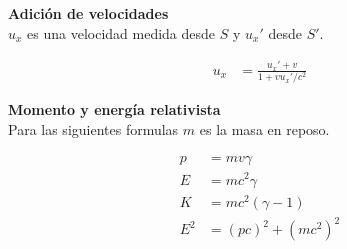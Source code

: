 \documentclass[12pt]{article}
\begin{document}
\textbf{Adición de velocidades}\\
$u_x$ es una velocidad medida desde $S$ y $u_x'$ desde $S'$. 

\begin{align*}
u_x &= \frac{u_x'+v}{1+vu_x'/c^2}
\end{align*}

\textbf{Momento y energía relativista}\\

Para las siguientes formulas $m$ es la masa en reposo.

\begin{align*}
p &= m  v \gamma\\
E &= m c^2\gamma\\
K &=  m  c^2 (\gamma-1)\\
E^2 &= (pc)^2 + (mc^2)^2
\end{align*}
\end{document}
